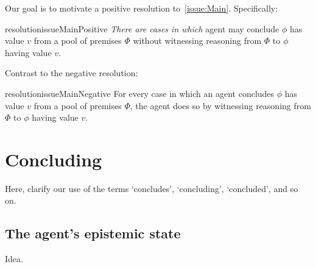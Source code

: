 \begin{note}[Resolutions]
  Our goal is to motivate a positive resolution to~\autoref{issue:Main}.
  Specifically:

  \begin{restatable}[Positive]{resolution}{issueMainPositive}
    \label{issue:Main:R:p}
    \emph{There are cases in which} agent may conclude \(\phi\) has value \(v\) from a pool of premises \(\Phi\) without witnessing reasoning from \(\Phi\) to \(\phi\) having value \(v\).
  \end{restatable}

  Contrast to the negative resolution:

  \begin{restatable}[Negative]{resolution}{issueMainNegative}
    \label{issue:Main:R:n}
    For every case in which an agent concludes \(\phi\) has value \(v\) from a pool of premises \(\Phi\), the agent does so by witnessing reasoning from \(\Phi\) to \(\phi\) having value \(v\).
  \end{restatable}
\end{note}

\section{Concluding}
\label{sec:ideas-1}

\begin{note}[Outline]
  Here, clarify our use of the terms `concludes', `concluding', `concluded', and so on.
\end{note}

\subsection{The agent's epistemic state}
\label{sec:agents-epist-state}

\begin{note}
  Idea.
\end{note}

